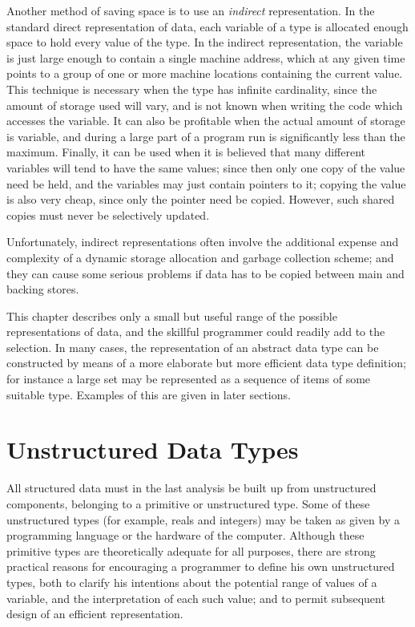 \documentclass[twoside,11pt]{book}
\begin{document}
Another method of saving space is to use an \textit{indirect} representation. In the standard direct representation of data, each variable of a type is allocated enough space to hold every value of the type. In the indirect representation, the variable is just large enough to contain a single machine address, which at any given time points to a group of one or more machine locations containing the current value. This technique is necessary when the type has infinite cardinality, since the amount of storage used will vary, and is not known when writing the code which accesses the variable. It can also be profitable when the actual amount of storage is variable, and during a large part of a program run is significantly less than the maximum. Finally, it can be used when it is believed that many different variables will tend to have the same values; since then only one copy of the value need be held, and the variables may just contain pointers to it; copying the value is also very cheap, since only the pointer need be copied. However, such shared copies must never be selectively updated.

Unfortunately, indirect representations often involve the additional expense and complexity of a dynamic storage allocation and garbage collection scheme; and they can cause some serious problems if data has to be copied between main and backing stores.

This chapter describes only a small but useful range of the possible representations of data, and the skillful programmer could readily add to the selection. In many cases, the representation of an abstract data type can be constructed by means of a more elaborate but more efficient data type definition; for instance a large set may be represented as a sequence of items of some suitable type. Examples of this are given in later sections.

\section[Unstructured data types]{Unstructured Data Types}
\label{sec:unstructured-data-types}

All structured data must in the last analysis be built up from unstructured components, belonging to a primitive or unstructured type. Some of these unstructured types (for example, reals and integers) may be taken as given by a programming language or the hardware of the computer. Although these primitive types are theoretically adequate for all purposes, there are strong practical reasons for encouraging a programmer to define his own unstructured types, both to clarify his intentions about the potential range of values of a variable, and the interpretation of each such value; and to permit subsequent design of an efficient representation.
\end{document}
